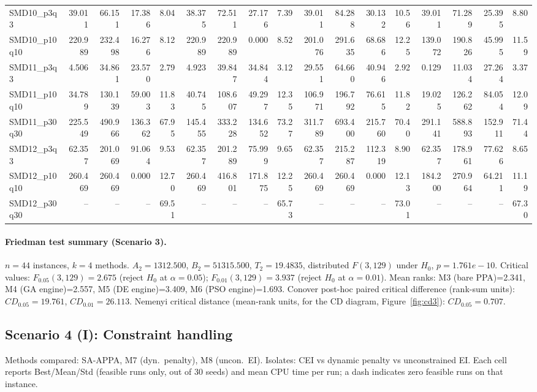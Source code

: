 \begin{longtable}{lrrrrrrrrrrrrrrrr}
SMD10\_p3q3 & 39.011 & 66.151 & 17.386 & 8.04 & 38.375 & 72.511 & 27.176 & 7.39 & 39.011 & 84.288 & 30.132 & 10.56 & 39.011 & 71.289 & 25.395 & 8.80 \\
SMD10\_p10q10 & 220.989 & 232.498 & 16.276 & 8.12 & 220.989 & 220.989 & 0.000 & 8.52 & 201.076 & 291.635 & 68.686 & 12.25 & 139.072 & 190.826 & 45.995 & 11.59 \\
SMD11\_p3q3 & 4.506 & 34.861 & 23.570 & 2.79 & 4.923 & 39.847 & 34.844 & 3.12 & 29.551 & 64.660 & 40.946 & 2.92 & 0.129 & 11.034 & 27.264 & 3.37 \\
SMD11\_p10q10 & 34.789 & 130.139 & 59.003 & 11.83 & 40.745 & 108.607 & 49.297 & 12.35 & 106.971 & 196.792 & 76.615 & 11.82 & 19.025 & 126.262 & 84.054 & 12.09 \\
SMD11\_p30q30 & 225.549 & 490.966 & 136.362 & 67.95 & 145.455 & 333.228 & 134.652 & 73.27 & 311.789 & 693.400 & 215.760 & 70.40 & 291.141 & 588.893 & 152.911 & 71.44 \\
SMD12\_p3q3 & 62.357 & 201.069 & 91.064 & 9.53 & 62.357 & 201.289 & 75.999 & 9.65 & 62.357 & 215.287 & 112.319 & 8.90 & 62.357 & 178.961 & 77.626 & 8.65 \\
SMD12\_p10q10 & 260.469 & 260.469 & 0.000 & 12.70 & 260.469 & 416.801 & 171.875 & 12.25 & 260.469 & 260.469 & 0.000 & 12.13 & 184.200 & 270.964 & 64.211 & 11.19 \\
SMD12\_p30q30 & -- & -- & -- & 69.51 & -- & -- & -- & 65.73 & -- & -- & -- & 73.01 & -- & -- & -- & 67.30 \\
\end{longtable}
\endgroup

\paragraph{Friedman test summary (Scenario 3).}
$n=44$ instances, $k=4$ methods. $A_2=1312.500$, $B_2=51315.500$, $T_2=19.4835$, distributed $F(3,129)$ under $H_0$, $p=1.761e-10$. Critical values: $F_{0.05}(3,129)=2.675$ (reject $H_0$ at $\alpha=0.05$); $F_{0.01}(3,129)=3.937$ (reject $H_0$ at $\alpha=0.01$). Mean ranks: M3 (bare PPA)=2.341, M4 (GA engine)=2.557, M5 (DE engine)=3.409, M6 (PSO engine)=1.693. Conover post-hoc paired critical difference (rank-sum units): $CD_{0.05}=19.761$, $CD_{0.01}=26.113$. Nemenyi critical distance (mean-rank units, for the CD diagram, Figure~\ref{fig:cd3}): $CD_{0.05}=0.707$.

\subsection{Scenario 4 (I): Constraint handling}
\label{app:scenario4}
Methods compared: SA-APPA, M7 (dyn.\ penalty), M8 (uncon.\ EI). Isolates: CEI vs dynamic penalty vs unconstrained EI. Each cell reports Best/Mean/Std (feasible runs only, out of 30 seeds) and mean CPU time per run; a dash indicates zero feasible runs on that instance.

